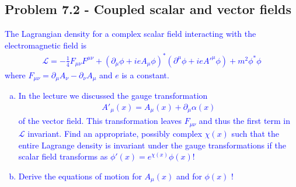 \documentclass[../main.tex]{subfiles}
\begin{document}
\subsection{Problem 7.2 - Coupled scalar and vector fields}
\textcolor{blue}{The Lagrangian density for a complex scalar field interacting with the electromagnetic
field is
\begin{align}
\mathcal{L}=-\frac{1}{4}F_{\mu\nu}F^{\mu\nu}+(\partial_\mu\phi+ieA_\mu\phi)^*(\partial^\mu\phi+ieA'^\mu\phi)+m^2\phi^*\phi
\end{align}
where $F_{\mu\nu}=\partial_\mu A_\nu-\partial_\nu A_\mu$ and $e$ is a constant.
\begin{enumerate}[(a)]
\item In the lecture we discussed the gauge transformation
\begin{align}
A'_\mu(x)=A_\mu(x)+\partial_\mu\alpha(x)
\end{align}
of the vector field. This transformation leaves $F_{\mu\nu}$ and thus the first term in $\mathcal{L}$
invariant. Find an appropriate, possibly complex $\chi(x)$ such that the entire Lagrange
density is invariant under the gauge transformations  if the scalar field transforms
as $\phi'(x) = e^{\chi(x)}\phi(x)$!
\item Derive the equations of motion for $A_\mu(x)$ and for $\phi(x)$ !
\end{enumerate}
}
\end{document}
